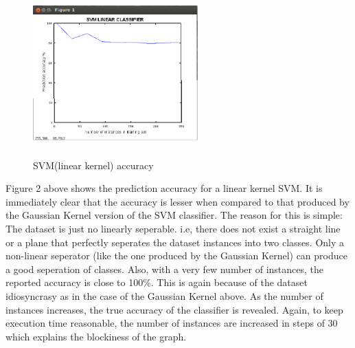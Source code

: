 \documentclass{acm_proc_article-sp}
\begin{document}
\begin{figure}
\centering
\includegraphics[width=2.5in, height=2.5in]{svml.png}
\caption{SVM(linear kernel) accuracy}
\end{figure}
Figure 2 above shows the prediction accuracy for a linear kernel SVM. It is immediately clear that the accuracy is lesser when compared to that produced by the Gaussian Kernel version of the SVM classifier. The reason for this is simple: The dataset is just no linearly seperable. i.e, there does not exist a straight line or a plane that perfectly seperates the dataset instances into two classes. Only a non-linear seperator (like the one produced by the Gaussian Kernel) can produce a good seperation of classes. Also, with a very few number of instances, the reported accuracy is close to 100\%. This is again because of the dataset idiosyncrasy as in the case of the Gaussian Kernel above. As the number of instances increases, the true accuracy of the classifier is revealed. Again, to keep execution time reasonable, the number of instances are increased in steps of 30 which explains the blockiness of the graph.
\end{document}
